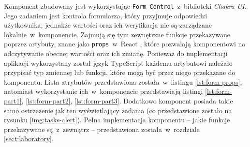 Komponent zbudowany jest wykorzystując \texttt{Form Control}~z~biblioteki \textit{Chakra UI}. Jego
zadaniem jest kontrola formularza, który przyjmuje odpowiedzi użytkownika, jednakże wartości oraz
ich weryfikacja nie są zarządzane lokalnie~w~komponencie. Zajmują się tym zewnętrzne funkcje
przekazywane poprzez artybuty, znane jako \texttt {props}~w~React \cite{react-docs}, które pozwalają
komponentowi na odczytywanie obecnej wartości oraz ich zmianę. Ponieważ do implementacji aplikacji
wykorzystany został język TypeScript każdemu artybutowi należało przypisać typ zmiennej lub funkcji,
które mogą być przez niego przekazane do komponentu. Lista atrybutów przedstawiona
została~w~listingu \ref{lst:form-props}, natomiast wykorzystanie ich~w~komponencie przedstawiają
listingi \ref{lst:form-part1}, \ref{lst:form-part2}, \ref{lst:form-part3}. Dodatkowo komponent
posiada takie samo ostrzeżenie jak ten wyświetlający zadania (co przedstawione zostało na
rysunku \ref{img:tasks-alert}). Pełna implementacja komponentu -- jakie funkcje przekazywane
są~z~zewnątrz -- przedstawiona została~w~rozdziale \ref{sect:laboratory}.





